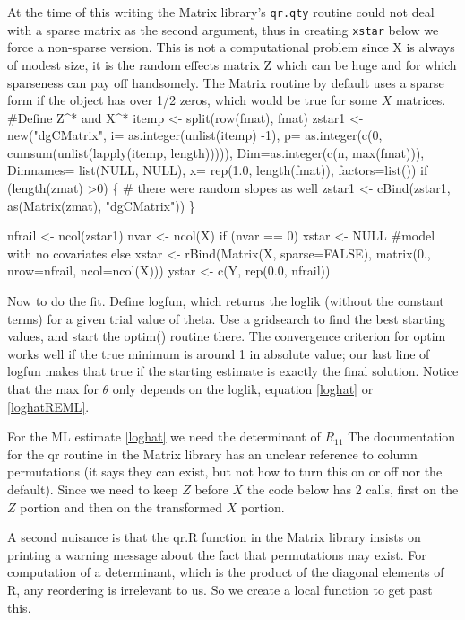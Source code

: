 \documentclass{article}
\begin{document}
At the time of this writing the Matrix library's {\tt{}qr.qty} routine  %
could not deal with a sparse matrix as the second argument,
thus in creating {\tt{}xstar} below we force a non-sparse version.
This is not a computational problem since X is always of modest size,
it is the random effects matrix Z which can be huge and for which
sparseness can pay off handsomely.
The Matrix routine by
default uses a sparse form if the object has over 1/2 zeros,
which would be true for some $X$ matrices.
\nwenddocs{}\endmoddef
#Define Z^* and X^*
itemp <- split(row(fmat), fmat)
zstar1 <- new("dgCMatrix", 
              i= as.integer(unlist(itemp) -1),
              p= as.integer(c(0, cumsum(unlist(lapply(itemp, length))))),
              Dim=as.integer(c(n, max(fmat))),
              Dimnames= list(NULL, NULL),
              x= rep(1.0, length(fmat)),
              factors=list())
if (length(zmat) >0)  \{
    # there were random slopes as well
    zstar1 <- cBind(zstar1, as(Matrix(zmat), "dgCMatrix"))
\}

nfrail <- ncol(zstar1)
nvar <- ncol(X)
if (nvar == 0)  xstar <- NULL  #model with no covariates
else xstar <- rBind(Matrix(X, sparse=FALSE),
                    matrix(0., nrow=nfrail, ncol=ncol(X)))
ystar <- c(Y, rep(0.0, nfrail))
\nwendcode{}\nwdocspar

Now to do the fit. 
Define logfun, which returns the loglik (without the constant terms) for
a given trial value of theta.
Use a gridsearch to find the best starting values, and start the
optim() routine there.
The convergence criterion for optim works well if the true minimum is
around 1 in absolute value; our last line of logfun makes that true 
if the starting estimate is exactly the final solution.
Notice that the max for $\theta$ only depends on the loglik,
equation \ref{loghat} or \ref{loghatREML}.

For the ML estimate \ref{loghat} we need the determinant of $R_{11}$
The documentation for the qr routine in the Matrix library has an
unclear reference to column permutations (it says they can exist, but
not how to turn this on or off nor the default).  Since we need to
keep $Z$ before $X$ the code below has 2 calls, first on the $Z$
portion and then on the transformed $X$ portion.

A second nuisance is that the qr.R function in the Matrix
library insists on printing a warning message about the fact
that permutations may exist.  For computation of a determinant,
which is the product of the diagonal elements of R,
any reordering is irrelevant to us.  So we create a local function
to get past this.
\end{document}
